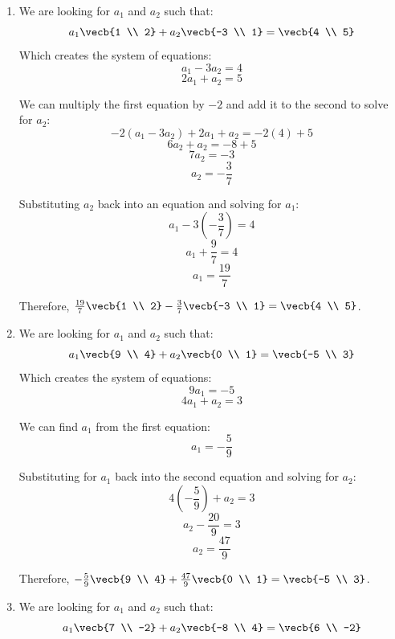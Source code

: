 \begin{Answer}[ref = combo]
\begin{enumerate}
    \item We are looking for $a_1$ and $a_2$ such that:
    $$
    a_1 \vecb{1 \\ 2} + a_2 \vecb{-3 \\ 1} = \vecb{4 \\ 5}
    $$
    Which creates the system of equations:
    $$a_1 - 3 a_2 = 4$$
    $$2 a_1 + a_2 = 5$$

    We can multiply the first equation by $-2$ and add it to the second to 
    solve for $a_2$:
    $$-2 \left( a_1 - 3 a_2 \right) + 2 a_1 + a_2 = -2 \left( 4 \right) + 5$$
    $$6 a_2 + a_2 = -8 + 5$$
    $$7 a_2 = -3$$
    $$a_2 = -\frac{3}{7}$$

    Substituting $a_2$ back into an equation and solving for $a_1$:
    $$a_1 - 3 \left( -\frac{3}{7} \right) = 4$$
    $$a_1 + \frac{9}{7} = 4$$
    $$a_1 = \frac{19}{7}$$

    Therefore, $\frac{19}{7} \vecb{1 \\ 2} - \frac{3}{7} \vecb{-3 \\ 1} = \vecb{4 \\ 5}$.

    \item We are looking for $a_1$ and $a_2$ such that:
    $$
    a_1 \vecb{9 \\ 4} + a_2 \vecb{0 \\ 1} = \vecb{-5 \\ 3}
    $$
    Which creates the system of equations:
    $$9 a_1 = -5$$
    $$4 a_1 + a_2 = 3$$

    We can find $a_1$ from the first equation:
    $$a_1 = -\frac{5}{9}$$

    Substituting for $a_1$ back into the second equation and solving for $a_2$:
    $$4 \left( -\frac{5}{9} \right) + a_2 = 3$$
    $$a_2 - \frac{20}{9} = 3$$
    $$a_2 = \frac{47}{9}$$

    Therefore, $-\frac{5}{9} \vecb{9 \\ 4} + \frac{47}{9} \vecb{0 \\ 1} = \vecb{-5 \\ 3}$.

    \item We are looking for $a_1$ and $a_2$ such that:
    $$
    a_1 \vecb{7 \\ -2} + a_2 \vecb{-8 \\ 4} = \vecb{6 \\ -2}
    $$


\end{enumerate}
\end{Answer}
